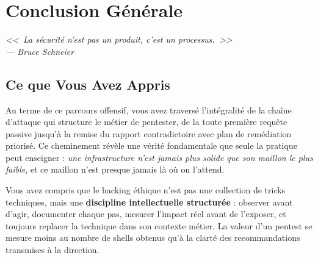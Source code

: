 

\chapter*{Conclusion Générale}

\begin{flushright}
    \itshape
    <<~La sécurité n'est pas un produit, c'est un processus.~>>\\[0.5ex]
    \small--- Bruce Schneier
\end{flushright}

\vspace{1.5ex}

\section*{Ce que Vous Avez Appris}

Au terme de ce parcours offensif, vous avez traversé l'intégralité de la
chaîne d'attaque qui structure le métier de pentester, de la toute première
requête  passive jusqu'à la remise du rapport contradictoire avec
plan de remédiation priorisé. Ce cheminement révèle une vérité fondamentale
que seule la pratique peut enseigner : \textit{une infrastructure n'est
jamais plus solide que son maillon le plus faible}, et ce maillon n'est
presque jamais là où on l'attend.

Vous avez compris que le hacking éthique n'est pas une collection de
\og{}tricks\fg{} techniques, mais une \textbf{discipline intellectuelle
structurée} : observer avant d'agir, documenter chaque pas, mesurer l'impact
réel avant de l'exposer, et toujours replacer la technique dans son contexte
métier. La valeur d'un pentest se mesure moins au nombre de shells obtenus
qu'à la clarté des recommandations transmises à la direction.

